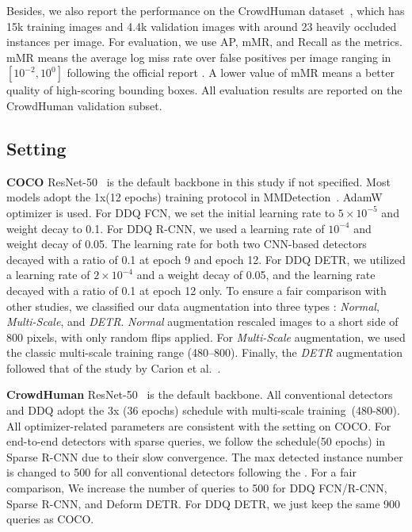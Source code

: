 \documentclass[10pt,twocolumn,letterpaper]{article}
\begin{document}
Besides, we also report the performance on the CrowdHuman dataset~\cite{shao2018crowdhuman}, which has 15k training images and 4.4k validation images with around 23 heavily occluded instances per image. For evaluation, we use AP, mMR, and Recall as the metrics. mMR means the average log miss rate over false positives per image ranging in $\left[10^{-2}, 10^0\right]$ following the official report \cite{shao2018crowdhuman}. A lower value of mMR means a better quality of high-scoring bounding boxes. All evaluation results are reported on the CrowdHuman validation subset. 

\subsection{Setting}
\noindent\textbf{COCO} ResNet-50~\cite{he2016deep} is the default backbone in this study if not specified. Most models adopt the 1x(12 epochs) training protocol in MMDetection~\cite{chen2019mmdetection}. AdamW~\cite{loshchilov2018decoupled} optimizer is used. For DDQ FCN, we set the initial learning rate to \textbf{$5\times 10^{-5}$} and weight decay to 0.1. For DDQ R-CNN, we used a learning rate of \textbf{$10^{-4}$} and weight decay of 0.05. The learning rate for both two CNN-based detectors decayed with a ratio of 0.1 at epoch 9 and epoch 12. For DDQ DETR, we utilized a learning rate of \textbf{$2\times 10^{-4}$} and a weight decay of 0.05, and the learning rate decayed with a ratio of 0.1 at epoch 12 only. To ensure a fair comparison with other studies, we classified our data augmentation into three types \label{link:aug}: \emph{Normal}, \emph{Multi-Scale}, and \emph{DETR}. \emph{Normal} augmentation rescaled images to a short side of 800 pixels, with only random flips applied. For \emph{Multi-Scale} augmentation, we used the classic multi-scale training range (480--800). Finally, the \emph{DETR} augmentation followed that of the study by Carion et al.~\cite{carion2020end}. 

\noindent\textbf{CrowdHuman} ResNet-50~\cite{he2016deep} is the default backbone. All conventional detectors and DDQ  adopt the 3x (36 epochs) schedule with multi-scale training~(480-800). All optimizer-related parameters are consistent with the setting on COCO. For end-to-end detectors with sparse queries, we follow the schedule(50 epochs) in Sparse R-CNN due to their slow convergence. The max detected instance number is changed to 500 for all conventional detectors following the \cite{wang2021end}. For a fair comparison, We increase the number of queries to 500 for DDQ FCN/R-CNN, Sparse R-CNN, and Deform DETR. For DDQ DETR, we just keep the same 900 queries as COCO.
\end{document}
